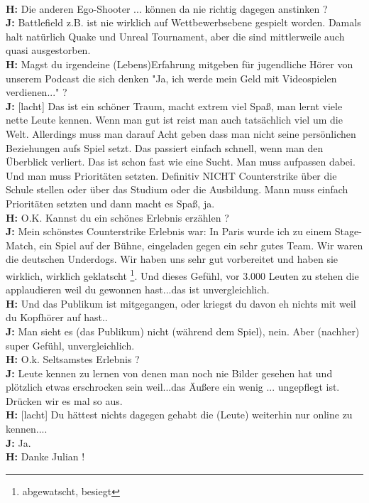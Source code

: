 \documentclass[10pt,a4paper,ngerman,twoside]{article} %
\begin{document}
\\ \textbf{H:} Die anderen Ego-Shooter ... können da nie richtig dagegen anstinken ?
\\ \textbf{J:} Battlefield z.B. ist nie wirklich auf Wettbewerbsebene gespielt worden. Damals halt natürlich Quake und Unreal Tournament, aber die sind mittlerweile auch quasi ausgestorben.
\\ \textbf{H:} Magst du irgendeine (Lebens)Erfahrung mitgeben für jugendliche Hörer von unserem Podcast die sich denken "Ja, ich werde mein Geld mit Videospielen verdienen..." ?
\\ \textbf{J:} [lacht] Das ist ein schöner Traum, macht extrem viel Spaß, man lernt viele nette Leute kennen. Wenn man gut ist reist man auch tatsächlich viel um die Welt. Allerdings muss man darauf Acht geben dass man nicht seine persönlichen Beziehungen aufs Spiel setzt. Das passiert einfach schnell, wenn man den Überblick verliert. Das ist schon fast wie eine Sucht. Man muss aufpassen dabei. Und man muss Prioritäten setzten. Definitiv NICHT Counterstrike über die Schule stellen oder über das Studium oder die Ausbildung. Mann muss einfach Prioritäten setzten und dann macht es Spaß, ja.
\\ \textbf{H:} O.K. Kannst du ein schönes Erlebnis erzählen ?
\\ \textbf{J:} Mein schönstes Counterstrike Erlebnis war: In Paris wurde ich zu einem Stage-Match, ein Spiel auf der Bühne, eingeladen gegen ein sehr gutes Team. Wir waren die deutschen Underdogs. Wir haben uns sehr gut vorbereitet und haben sie wirklich, wirklich geklatscht \footnote{abgewatscht, besiegt}. Und dieses Gefühl, vor 3.000 Leuten zu stehen die applaudieren weil du gewonnen hast...das ist unvergleichlich.
\\ \textbf{H:} Und das Publikum ist mitgegangen, oder kriegst du davon eh nichts mit weil du Kopfhörer auf hast..
\\ \textbf{J:} Man sieht es (das Publikum) nicht (während dem Spiel), nein. Aber (nachher) super Gefühl, unvergleichlich.
\\ \textbf{H:} O.k. Seltsamstes Erlebnis ?
\\ \textbf{J:} Leute kennen zu lernen von denen man noch nie Bilder gesehen hat und plötzlich etwas erschrocken sein weil...das Äußere ein wenig ... ungepflegt ist. Drücken wir es mal so aus.
\\ \textbf{H:} [lacht] Du hättest nichts dagegen gehabt die (Leute) weiterhin nur online zu kennen....
\\ \textbf{J:} Ja.
\\ \textbf{H:} Danke Julian !
\end{document}

